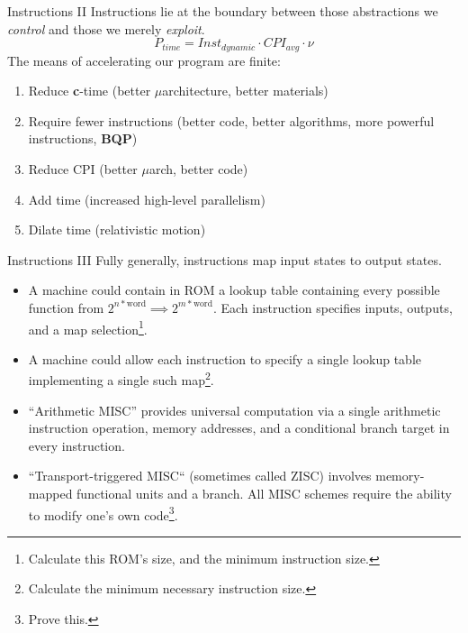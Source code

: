\documentclass[xcolor={dvipsnames,table}]{beamer}
\begin{document}
\begin{frame}{Instructions II}
Instructions lie at the boundary between those abstractions we \textit{control} and those
we merely \textit{exploit}.
\begin{equation}
P_{time} = Inst_{dynamic}\cdot CPI_{avg}\cdot\nu
\end{equation}
The means of accelerating our program are finite:
\begin{enumerate}
\item Reduce \textbf{c}-time (better $\mu$architecture, better materials)
\item Require fewer instructions (better code, better algorithms, more powerful instructions, \textbf{BQP})
\item Reduce CPI (better $\mu$arch, better code)
\item Add time (increased high-level parallelism)
\item Dilate time (relativistic motion)
\end{enumerate}
\end{frame}

\begin{frame}{Instructions III}
Fully generally, instructions map input states to output states.
\small{
\begin{itemize}
\item A machine could contain in ROM a lookup table containing every possible
function from $2^{n*\text{word}}\implies 2^{m*\text{word}}$. Each instruction
specifies inputs, outputs, and a map selection\footnote{Calculate this ROM's size, and the minimum instruction size.}.
\item A machine could allow each instruction to specify a single lookup table implementing
a single such map\footnote{Calculate the minimum necessary instruction size.}.
\item ``Arithmetic MISC'' provides universal computation via a single arithmetic instruction
operation, memory addresses, and a conditional branch target in every instruction.
\item``Transport-triggered MISC`` (sometimes called ZISC) involves memory-mapped
functional units and a branch. All MISC schemes require the ability to modify one's
own code\footnote{Prove this.}.
\end{itemize}
}
\end{frame}
\end{document}
